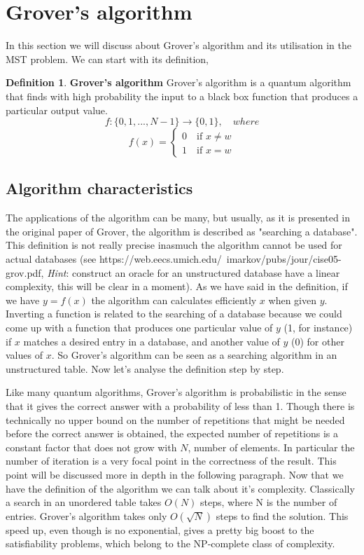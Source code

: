 \documentclass[main.tex]{subfiles}
\theoremstyle{definition}
\newtheorem{definition}{Definition}[section]
\begin{document}
\section{Grover's algorithm}
In this section we will discuss about Grover's algorithm and its 
utilisation in the MST problem.
We can start with its definition,
\theoremstyle{definition}
	\begin{definition}{\textbf{Grover's algorithm}}
	Grover's algorithm is a quantum algorithm that finds with high 
	probability the input to a black box function that produces a 
	particular output value.
	$$f:\{0, 1, ..., N-1\}\rightarrow\{0,1\},\quad where$$ 
	\[
    f(x)=\left\{
                \begin{array}{ll}
                  0 \quad\text{if }x \neq w\\
                  1 \quad\text{if }x = w
                \end{array}
              \right.
  \]
	\end{definition}
	
	\subsection{Algorithm characteristics}
The applications of the algorithm can be many, but usually, as it is presented in the original paper of Grover, the algorithm
is described as "searching a database". This definition is not really precise inasmuch the algorithm cannot be used for actual databases (see https://web.eecs.umich.edu/~imarkov/pubs/jour/cise05-grov.pdf, \textit{Hint}: construct an oracle for an unstructured database have a linear complexity, this will be clear in a moment). As we have said in the definition, if we have $y=f(x)$ the algorithm can calculates efficiently $x$ when given $y$.
Inverting a function is related to the searching of a database because we could come up with a function that produces one particular value of $y$ (1, for instance) if $x$ matches a desired entry in a database, and another value of $y$ (0) for other values of $x$. So Grover's algorithm can be seen as a searching algorithm in an unstructured table.
Now let's analyse the definition step by step. 

Like many quantum algorithms, Grover's algorithm is probabilistic in the sense that it 
gives the correct answer with a probability of less than 1. Though there is technically no upper bound on the number of repetitions that might be needed before the correct answer is obtained, the expected number of repetitions is a constant factor that does not grow with $N$, number of elements.
In particular the number of iteration is a very focal point in the correctness of the result. This point will be discussed more in depth in the following paragraph.
Now that we have the definition of the algorithm we can talk about it's complexity. Classically a search in an unordered table takes $O(N)$ steps, where N is the number of entries. Grover's algorithm takes only $O(\sqrt{N})$ steps to find the solution. This speed up, even though is no exponential, gives a pretty big boost to the satisfiability problems, which belong to the NP-complete class of complexity.
\end{document}
